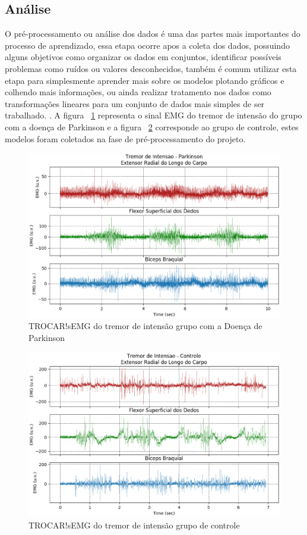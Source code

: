 \subsection{Análise}
O pré-processamento ou análise dos dados é uma das partes mais importantes do processo de aprendizado, essa etapa ocorre apos a coleta dos dados, possuindo alguns objetivos como organizar os dados em conjuntos, identificar possíveis problemas como ruídos ou valores desconhecidos, também é comum utilizar esta etapa para simplesmente aprender mais sobre os modelos plotando gráficos e colhendo mais informações, ou ainda realizar tratamento nos dados como transformações lineares para um conjunto de dados mais simples de ser trabalhado. \cite{batista2003pre}. A figura ~\ref{tremor_i_parkinson} representa o sinal EMG do tremor de intensão do grupo com a doença de Parkinson e a figura ~\ref{tremor_intensao} corresponde ao grupo de controle, estes modelos foram coletados na fase de pré-processamento do projeto.


\begin{figure}[!htb]
   \centering
    \includegraphics[width=1\textwidth]{figuras/tremor_i_parkinson.eps}
    \caption{TROCAR!sEMG do tremor de intensão grupo com a Doença de Parkinson}
    \label{tremor_i_parkinson}
\end{figure}

\begin{figure}[!htb]
   \centering
    \includegraphics[width=1\textwidth]{figuras/tremor_intensao.eps}
    \caption{TROCAR!sEMG do tremor de intensão grupo de controle}
    \label{tremor_intensao}
\end{figure}


